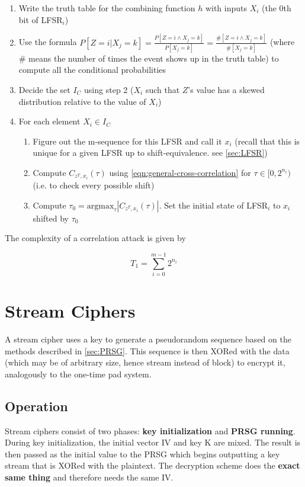 \documentclass[11pt]{report}
\begin{document}
\begin{enumerate}
	\item Write the truth table for the combining function $h$ with inputs $X_i$ (the 0th bit of LFSR$_i$)
	\item Use the formula $P[Z=i|X_j=k] = \frac{P[Z=i \land X_j=k]}{P[X_j=k]} = \frac{\#[Z=i \land X_j=k]}{\#[X_j=k]}$ (where \# means the number of times the event shows up in the truth table) to compute all the conditional probabilities
	\item Decide the set $I_C$ using step 2 ($X_i$ such that $Z$'s value has a skewed distribution relative to the value of $X_i$)
	\item For each element $X_i \in I_C$
	\begin{enumerate}
		\item Figure out the m-sequence for this LFSR and call it $x_i$ (recall that this is unique for a given LFSR up to shift-equivalence. see \autoref{sec:LFSR})
		\item Compute $C_{z^T, x_i}(\tau)$ using \autoref{eqn:general-cross-correlation} for $\tau \in [0, 2^{n_i})$  (i.e. to check every possible shift)
		\item Compute $\tau_0 = \text{argmax}_\tau |C_{z^T, x_i}(\tau)|$. Set the initial state of LFSR$_i$ to $x_i$ shifted by $\tau_0$
	\end{enumerate}
\end{enumerate}

The complexity of a correlation attack is given by

\begin{equation}
	T_1 = \sum_{i=0}^{m-1}2^{n_i}
\end{equation}


\section{Stream Ciphers}
A stream cipher uses a key to generate a pseudorandom sequence based on the methods described in \autoref{sec:PRSG}. This sequence is then XORed with the data (which may be of arbitrary size, hence stream instead of block) to encrypt it, analogously to the one-time pad system.

\subsection{Operation}
Stream ciphers consist of two phases: \textbf{key initialization} and \textbf{PRSG running}. During key initialization, the initial vector IV and key K are mixed. The result is then passed as the initial value to the PRSG which begins outputting a key stream that is XORed with the plaintext. The decryption scheme does the \textbf{exact same thing} and therefore needs the same IV.
\end{document}

